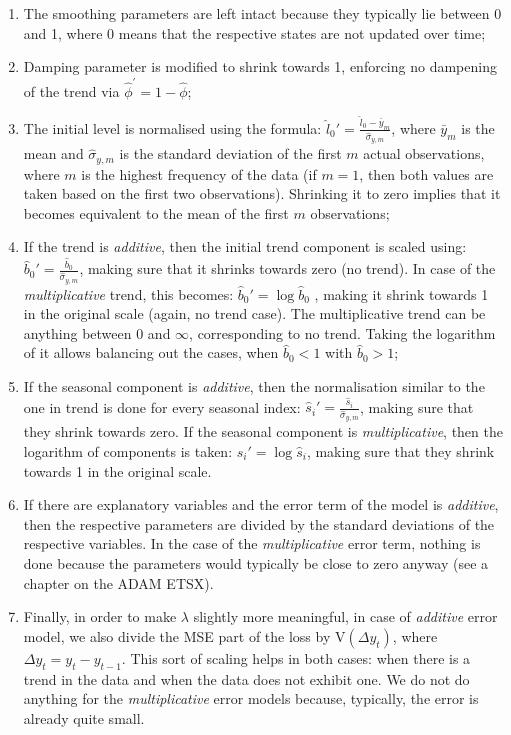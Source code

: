 \documentclass[
]{book}
\providecommand{\tightlist}{%
  \setlength{\itemsep}{0pt}\setlength{\parskip}{0pt}}
\theoremstyle{definition}
\theoremstyle{definition}
\theoremstyle{definition}
\theoremstyle{definition}
\theoremstyle{remark}
\begin{document}
\begin{enumerate}
\def\labelenumi{\arabic{enumi}.}
\tightlist
\item
  The smoothing parameters are left intact because they typically lie between 0 and 1, where 0 means that the respective states are not updated over time;
\item
  Damping parameter is modified to shrink towards 1, enforcing no dampening of the trend via \(\hat{\phi}^\prime=1-\hat{\phi}\);
\item
  The initial level is normalised using the formula: \(\hat{l}_0' = \frac{\hat{l}_0 -\bar{y}_m}{\hat{\sigma}_{y,m}}\), where \(\bar{y}_m\) is the mean and \(\hat{\sigma}_{y,m}\) is the standard deviation of the first \(m\) actual observations, where \(m\) is the highest frequency of the data (if \(m=1\), then both values are taken based on the first two observations). Shrinking it to zero implies that it becomes equivalent to the mean of the first \(m\) observations;
\item
  If the trend is \emph{additive}, then the initial trend component is scaled using: \(\hat{b}_0' = \frac{\hat{b}_0}{\hat{\sigma}_{y,m}}\), making sure that it shrinks towards zero (no trend). In case of the \emph{multiplicative} trend, this becomes: \(\hat{b}_0' = \log{\hat{b}_0}\) , making it shrink towards 1 in the original scale (again, no trend case). The multiplicative trend can be anything between 0 and \(\infty\), corresponding to no trend. Taking the logarithm of it allows balancing out the cases, when \(\hat{b}_0<1\) with \(\hat{b}_0>1\);
\item
  If the seasonal component is \emph{additive}, then the normalisation similar to the one in trend is done for every seasonal index: \(\hat{s}_i' = \frac{\hat{s}_i}{\hat{\sigma}_{y,m}}\), making sure that they shrink towards zero. If the seasonal component is \emph{multiplicative}, then the logarithm of components is taken: \(\hat{s}_i' = \log{\hat{s}_i}\), making sure that they shrink towards 1 in the original scale.
\item
  If there are explanatory variables and the error term of the model is \emph{additive}, then the respective parameters are divided by the standard deviations of the respective variables. In the case of the \emph{multiplicative} error term, nothing is done because the parameters would typically be close to zero anyway (see a chapter on the ADAM ETSX).
\item
  Finally, in order to make \(\lambda\) slightly more meaningful, in case of \emph{additive} error model, we also divide the MSE part of the loss by \(\mathrm{V}\left({\Delta}y_t\right)\), where \({\Delta}y_t=y_t-y_{t-1}\). This sort of scaling helps in both cases: when there is a trend in the data and when the data does not exhibit one. We do not do anything for the \emph{multiplicative} error models because, typically, the error is already quite small.
\end{enumerate}
\end{document}
